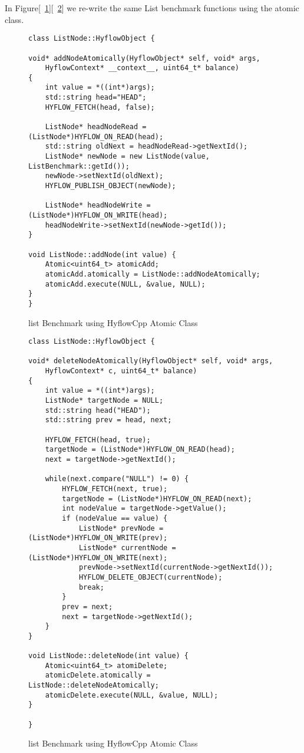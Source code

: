 \documentclass[12pt,english]{report}
\begin{document}
In Figure[~\ref{Fig:listClassAdd}][~\ref{Fig:listClassDelete}] we re-write the same List benchmark functions using the atomic class. 

\begin{figure}
\centering
\begin{lstlisting}
class ListNode::HyflowObject {

void* addNodeAtomically(HyflowObject* self, void* args,
	HyflowContext* __context__, uint64_t* balance)
{
	int value = *((int*)args);
	std::string head="HEAD";
	HYFLOW_FETCH(head, false);

	ListNode* headNodeRead =  (ListNode*)HYFLOW_ON_READ(head);
	std::string oldNext = headNodeRead->getNextId();
	ListNode* newNode = new ListNode(value, ListBenchmark::getId());
	newNode->setNextId(oldNext);
	HYFLOW_PUBLISH_OBJECT(newNode);

	ListNode* headNodeWrite = (ListNode*)HYFLOW_ON_WRITE(head);
	headNodeWrite->setNextId(newNode->getId());
}

void ListNode::addNode(int value) {
	Atomic<uint64_t> atomicAdd;	
	atomicAdd.atomically = ListNode::addNodeAtomically;
	atomicAdd.execute(NULL, &value, NULL);
}
}
\end{lstlisting}
\caption{list Benchmark using HyflowCpp Atomic Class}
\label{Fig:listClassAdd}
\end{figure}

\begin{figure}
\centering
\begin{lstlisting}
class ListNode::HyflowObject {

void* deleteNodeAtomically(HyflowObject* self, void* args,
	HyflowContext* c, uint64_t* balance)
{
	int value = *((int*)args);
	ListNode* targetNode = NULL;
	std::string head("HEAD");
	std::string prev = head, next;

	HYFLOW_FETCH(head, true);
	targetNode = (ListNode*)HYFLOW_ON_READ(head);
	next = targetNode->getNextId();

	while(next.compare("NULL") != 0) {
		HYFLOW_FETCH(next, true);
		targetNode = (ListNode*)HYFLOW_ON_READ(next);
		int nodeValue = targetNode->getValue();
		if (nodeValue == value) {
			ListNode* prevNode = (ListNode*)HYFLOW_ON_WRITE(prev);
			ListNode* currentNode = (ListNode*)HYFLOW_ON_WRITE(next);
			prevNode->setNextId(currentNode->getNextId());
			HYFLOW_DELETE_OBJECT(currentNode);
			break;
		}
		prev = next;
		next = targetNode->getNextId();
	}
}

void ListNode::deleteNode(int value) {
	Atomic<uint64_t> atomiDelete;	
	atomicDelete.atomically = ListNode::deleteNodeAtomically;
	atomicDelete.execute(NULL, &value, NULL);
}

}
\end{lstlisting}
\caption{list Benchmark using HyflowCpp Atomic Class}
\label{Fig:listClassDelete}
\end{figure}
\end{document}
